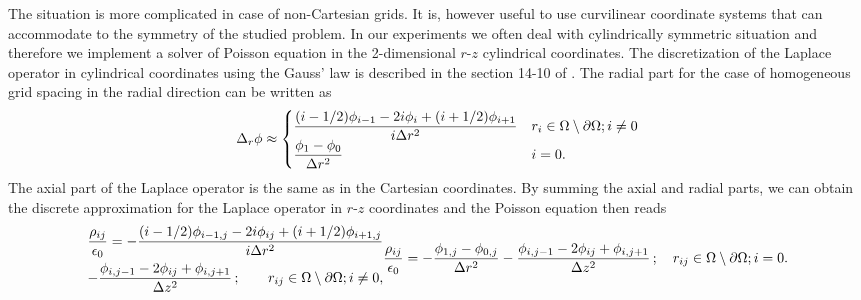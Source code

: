 The situation is more complicated in case of non-Cartesian grids. It is,
however useful to use curvilinear coordinate systems that can accommodate to the symmetry of the studied problem.
In our experiments we often deal with cylindrically symmetric situation and therefore we implement a solver of Poisson equation in the 2-dimensional
$r$-$z$ cylindrical coordinates.
The discretization of the Laplace operator
in cylindrical coordinates using the Gauss' law is described in the section 14-10 of \cite{birdsall1991}.
The radial part for the case of homogeneous grid spacing in the radial direction can be written as
\begin{equation}
\Delta_r\phi\approx
\begin{cases}
    \displaystyle\frac{(i-1/2)\phi_{i-1} - 2i\phi_{i} + (i+1/2)\phi_{i+1}}
    {i\Delta r^2} & r_{i} \in \Omega\setminus\partial\Omega; i\neq0\\
    \displaystyle\frac{\phi_{1} - \phi_{0}}
    {\Delta r^2} & i=0\text.
\end{cases}
\end{equation}
The axial part of the Laplace operator is the same as in the Cartesian
coordinates. By summing the axial and radial parts, we can obtain the discrete approximation for the
Laplace operator in $r$-$z$ coordinates and the Poisson equation then reads
\begin{subequations}
\begin{multline}
\frac{\rho_{ij}}{\epsilon_0} = 
    -\frac{(i-1/2)\phi_{i-1,j} - 2i\phi_{ij} + (i+1/2)\phi_{i+1,j}}
    {i\Delta r^2}\\
    -\frac{\phi_{i,j-1} - 2\phi_{ij} + \phi_{i,j+1}}
    {\Delta z^2}\,;\quad\hfill
 r_{ij} \in \Omega\setminus\partial\Omega; i\neq0,\\
\end{multline}
\begin{multline}
\frac{\rho_{ij}}{\epsilon_0} = 
    -\frac{\phi_{1,j} - \phi_{0,j}}
    {\Delta r^2}
    -\frac{\phi_{i,j-1} - 2\phi_{ij} + \phi_{i,j+1}}
    {\Delta z^2}\,;\quad\hfill
 r_{ij} \in \Omega\setminus\partial\Omega; i=0.\\
\end{multline}
\end{subequations}

